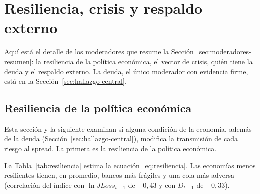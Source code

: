 \chapter{Resiliencia, crisis y respaldo externo}
\label{chap:anexo-moderadores}

Aquí está el detalle de los moderadores que resume la Sección~\ref{sec:moderadores-resumen}: la resiliencia de la política económica, el vector de crisis, quién tiene la deuda y el respaldo externo. La deuda, el único moderador con evidencia firme, está en la Sección~\ref{sec:hallazgo-central}.

\section{Resiliencia de la política económica}
\label{sec:robustez-resiliencia}

Esta sección y la siguiente examinan si alguna condición de la economía, además de la deuda (Sección~\ref{sec:hallazgo-central}), modifica la transmisión de cada riesgo al spread. La primera es la resiliencia de la política económica.

La Tabla~\ref{tab:resiliencia} estima la ecuación~\eqref{eq:resiliencia}. Las economías menos resilientes tienen, en promedio, bancos más frágiles y una cola más adversa (correlación del índice con $\ln JLoss_{t-1}$ de $-0{,}43$ y con $D_{t-1}$ de $-0{,}33$).

